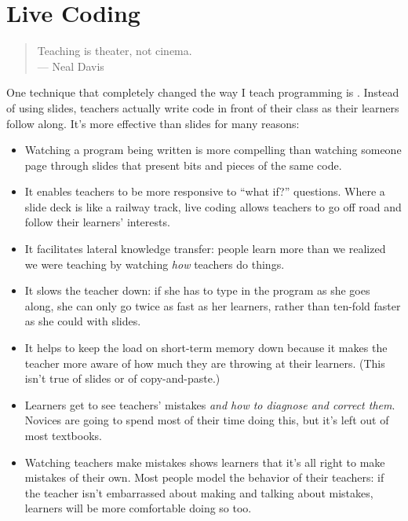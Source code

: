 \section{Live Coding}\label{s:performance-live}

\begin{quote}

  Teaching is theater, not cinema.\\
  --- Neal Davis

\end{quote}

One technique that completely changed the way I teach programming is
. Instead of using slides,
teachers actually write code in front of their class as their learners
follow along. It's more effective than slides for many reasons:

\begin{itemize}

  \item
    Watching a program being written is more compelling than watching
    someone page through slides that present bits and pieces of the
    same code.

  \item
    It enables teachers to be more responsive to ``what if?''
    questions. Where a slide deck is like a railway track, live coding
    allows teachers to go off road and follow their learners'
    interests.

  \item
    It facilitates lateral knowledge transfer: people learn more than
    we realized we were teaching by watching \emph{how} teachers do
    things.

  \item
    It slows the teacher down: if she has to type in the program as
    she goes along, she can only go twice as fast as her learners,
    rather than ten-fold faster as she could with slides.

  \item
    It helps to keep the load on short-term memory down because it
    makes the teacher more aware of how much they are throwing at
    their learners. (This isn't true of slides or of copy-and-paste.)

  \item
    Learners get to see teachers' mistakes \emph{and how to diagnose
      and correct them}. Novices are going to spend most of their time
    doing this, but it's left out of most textbooks.

  \item
    Watching teachers make mistakes shows learners that it's all right
    to make mistakes of their own. Most people model the behavior of
    their teachers: if the teacher isn't embarrassed about making and
    talking about mistakes, learners will be more comfortable doing so
    too.

\end{itemize}

